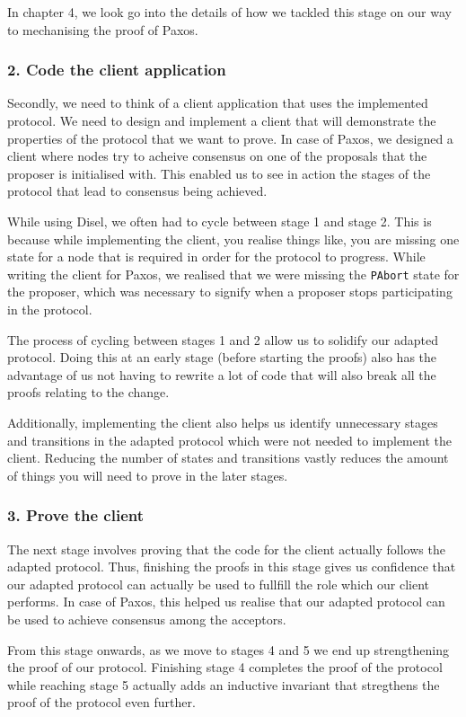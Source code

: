 In chapter 4, we look go into the details of how we tackled this stage on our way
to mechanising the proof of Paxos.

\subsubsection{2. Code the client application}
Secondly, we need to think of a client application that uses the implemented protocol.
We need to design and implement a client that will demonstrate the properties of the
protocol that we want to prove. In case of Paxos, we designed a client
where nodes try to acheive consensus on one of the proposals that the proposer
is initialised with. This enabled us to see in action the stages of the protocol
that lead to consensus being achieved.

While using Disel, we often had to cycle between stage 1 and stage 2.
This is because while implementing the client, you realise things like, you are
missing one state for a node that is required in order for the protocol to progress.
While writing the client for Paxos, we realised that we were missing the \texttt{PAbort}
state for the proposer, which was necessary to signify when a proposer stops
participating in the protocol.

The process of cycling between stages 1 and 2 allow us to solidify our adapted
protocol. Doing this at an early stage (before starting the proofs)
also has the advantage of us not having to rewrite a lot of code that will also
break all the proofs relating to the change.

Additionally, implementing the client also helps us identify unnecessary stages
and transitions in the adapted protocol which were not needed to implement the
client. Reducing the number of states and transitions vastly reduces the amount
of things you will need to prove in the later stages.

\subsubsection{3. Prove the client}
The next stage involves proving that the code for the client actually follows
the adapted protocol. Thus, finishing the proofs in this stage gives us
confidence that our adapted protocol can actually be used to fullfill the role
which our client performs. In case of Paxos, this helped us realise that our
adapted protocol can be used to achieve consensus among the acceptors.

From this stage onwards, as we move to stages 4 and 5 we end up strengthening
the proof of our protocol. Finishing stage 4 completes the proof of the protocol
while reaching stage 5 actually adds an inductive invariant that stregthens the
proof of the protocol even further.

